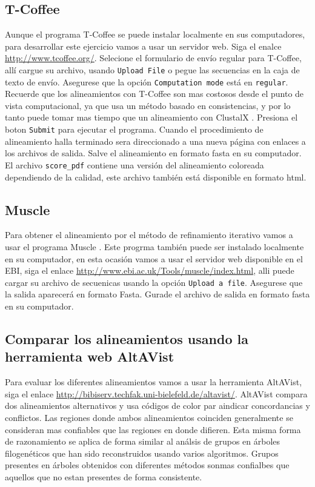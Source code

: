\documentclass[letter,11pt]{book}
\begin{document}
\subsection{{\sc T-Coffee}}

Aunque el programa {\sc T-Coffee} se puede instalar localmente en sus computadores, para desarrollar este ejercicio vamos a usar un servidor web. Siga el enalce \url{http://www.tcoffee.org/}. Selecione el formulario de envío regular para {\sc T-Coffee}, allí cargue su archivo, usando \Verb+Upload File+ o pegue las secuencias en la caja de texto de envío. Asegurese que la opción \Verb+Computation mode+ está en \Verb+regular+.  Recuerde que los alineamientos con {\sc T-Coffee} son mas costosos desde el punto de vista computacional, ya que usa un método basado en consistencias, y por lo tanto puede tomar mas tiempo que un alineamiento con {\sc ClustalX} \citep{Notredame2000}. Presiona el boton \Verb+Submit+ para ejecutar el programa. Cuando el procedimiento de alineamiento halla terminado sera direccionado a una nueva página con enlaces a los archivos de salida. Salve el alineamiento en formato fasta en su computador. El archivo \Verb+score_pdf+ contiene una versión del alineamiento coloreada dependiendo de la calidad, este archivo también está disponible en formato {\sc html}.

\subsection{{\sc Muscle}}

Para obtener el alineamiento por el método de refinamiento iterativo vamos a usar el programa {\sc Muscle} \citep{Edgar2004}. Este progrma también puede ser instalado localmente en su computador, en esta ocasión vamos a usar el servidor web disponible en el EBI, siga el enlace \url{http://www.ebi.ac.uk/Tools/muscle/index.html}, alli puede cargar su archivo de secuenicas usando la opción \Verb+Upload a file+. Asegurese que la salida aparecerá en formato Fasta. Gurade el archivo de salida en formato fasta en su computador.

\subsection{Comparar los alineamientos usando la herramienta web {\sc AltAVist}}

Para evaluar los diferentes alineamientos vamos a usar la herramienta {\sc AltAVist}, siga el enlace \url{http://bibiserv.techfak.uni-bielefeld.de/altavist/}. {\sc AltAVist} compara dos alineamientos alternativos y usa códigos de color par aindicar concordancias y conflictos. Las regiones donde ambos alineamientos coinciden generalmente se consideran mas confiables que las regiones en donde difieren. Esta misma forma de razonamiento se aplica de forma similar al análsis de grupos en árboles filogenéticos que han sido reconstruidos usando varios algoritmos. Grupos presentes en árboles obtenidos con diferentes métodos sonmas confialbes que aquellos que no estan presentes de forma consistente.
\end{document}
